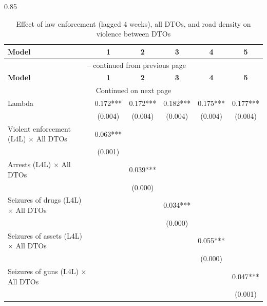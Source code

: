 \documentclass[12pt,letterpaper]{article}
\begin{document}
\begin{landscape}

\begin{center}
\small
\begin{spacing}{0.85}
\begin{longtable}{lccccc}

\caption{Effect of law enforcement (lagged 4 weeks), all DTOs, and road density on violence between DTOs} \label{tab:enforcement_allDTOs_Road_L4L} \\

\hline 
\multicolumn{1}{l}{\textbf{Model }} &\multicolumn{1}{c}{\textbf{1}} & \multicolumn{1}{c}{\textbf{2}} & \multicolumn{1}{c}{\textbf{3}} & \multicolumn{1}{c}{\textbf{4}} & \multicolumn{1}{c}{\textbf{ 5}} \\ \hline 
\endfirsthead


\multicolumn{6}{c}{{\tablename\ \thetable{} -- continued from previous page}} \\ \hline
\multicolumn{1}{l}{\textbf{Model }} &\multicolumn{1}{c}{\textbf{1}} & \multicolumn{1}{c}{\textbf{2}} & \multicolumn{1}{c}{\textbf{3}} & \multicolumn{1}{c}{\textbf{4}} & \multicolumn{1}{c}{\textbf{ 5}} \\ \hline 
\endhead

\hline \multicolumn{6}{c}{{Continued on next page}} \\ \hline
\endfoot

\hline \hline
\endlastfoot

Lambda & 0.172*** & 0.172*** & 0.182*** & 0.175*** & 0.177***  \\ 
 & (0.004)  & (0.004)  & (0.004)  & (0.004)  & (0.004)   \\ 
                 
Violent enforcement (L4L) $\times$ All DTOs & 0.063*** &   &   &   &    \\ 
 & (0.001)  &   &   &   &    \\ 
Arrests  (L4L)  $\times$ All DTOs &   & 0.039*** &   &   &    \\ 
 &   & (0.000)  &   &   &    \\ 
Seizures of drugs  (L4L)  $\times$ All DTOs &   &   & 0.034*** &   &    \\ 
 &   &   & (0.000)  &   &    \\ 
 Seizures of assets  (L4L)  $\times$ All DTOs &   &   &   & 0.055*** &    \\ 
 &   &   &   & (0.000)  &    \\ 
 Seizures of guns  (L4L) $\times$ All DTOs &   &   &   &   & 0.047***  \\ 
 &   &   &   &   & (0.001)   \\ 
                 

\end{longtable}
\end{spacing}
\end{center}
\end{landscape}
\end{document}
